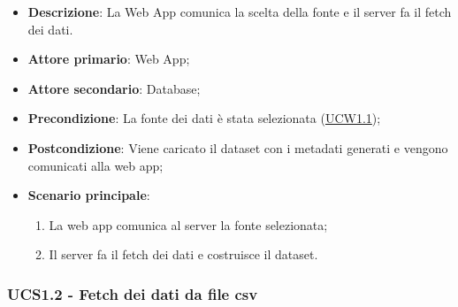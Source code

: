 \begin{itemize}

	\item \textbf{Descrizione}: La Web App comunica la scelta della fonte e il server fa il fetch dei dati.
	
    \item \textbf{Attore primario}: Web App;
	\item \textbf{Attore secondario}: Database;
        
    \item \textbf{Precondizione}:   La fonte dei dati è stata selezionata (\hyperref[ssub:ucw1.1]{UCW1.1});

    \item \textbf{Postcondizione}:  Viene caricato il dataset con i metadati generati e vengono comunicati alla web app;

	\item \textbf{Scenario principale}:
		\begin{enumerate}
			\item La web app comunica al server la fonte selezionata;
            \item Il server fa il fetch dei dati e costruisce il dataset.
        \end{enumerate}
	
\end{itemize}


\subsubsection{UCS1.2 - Fetch dei dati da file csv}
\label{ssub:ucs1.2}

